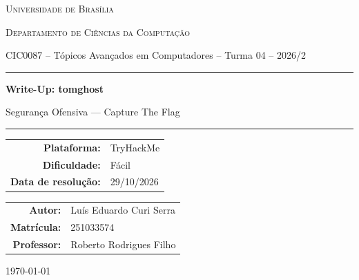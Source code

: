 \documentclass[12pt,a4paper]{article}
\newcommand{\desafioNome}{tomghost}
\newcommand{\plataforma}{TryHackMe}
\newcommand{\dificuldade}{Fácil}
\newcommand{\dataResolucao}{29/10/2026}
\newcommand{\autorNome}{Luís Eduardo Curi Serra}
\newcommand{\materia}{CIC0087 -- Tópicos Avançados em Computadores -- Turma 04 -- 2026/2}
\newcommand{\departamento}{Departamento de Ciências da Computação}
\newcommand{\matricula}{251033574}
\newcommand{\professor}{Roberto Rodrigues Filho}
\newcommand{\universidade}{Universidade de Brasília}
\begin{document}
\begin{titlepage}
  \thispagestyle{empty}
  \centering
  {\scshape \universidade \par}
  {\scshape \departamento \par}
  \vspace{0.4cm}
  {\small \materia \par}
  \vspace{2.5cm}

  \rule{\linewidth}{0.4pt}\par
  \vspace{0.6cm}
  {\huge \bfseries Write-Up: \desafioNome \par}
  \vspace{0.4cm}
  {\large Segurança Ofensiva --- Capture The Flag \par}
  \vspace{0.6cm}
  \rule{\linewidth}{0.4pt}\par

  \vspace{2.0cm}
  \begin{tabular}{rl}
    \textbf{Plataforma:}       & \plataforma       \\[4pt]
    \textbf{Dificuldade:}      & \dificuldade      \\[4pt]
    \textbf{Data de resolução:}& \dataResolucao    \\
  \end{tabular}

  \vfill

  \begin{tabular}{rl}
    \textbf{Autor:}     & \autorNome  \\[4pt]
    \textbf{Matrícula:} & \matricula  \\[4pt]
    \textbf{Professor:} & \professor  \\
  \end{tabular}

  \vspace{1.2cm}
  {\small \today \par}
\end{titlepage}

\newpage
\tableofcontents
\thispagestyle{fancy}
\newpage

\end{document}
